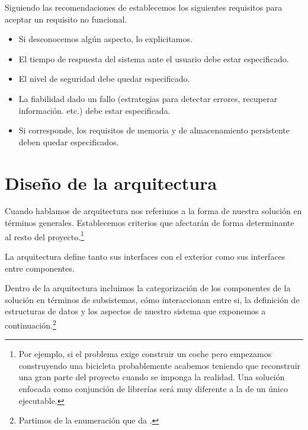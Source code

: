 Siguiendo las recomendaciones de \cite[Checklist: Requirements]{CodeComplete2} establecemos
los siguientes requisitos para aceptar un requisito no funcional. 

\begin{itemize}[noitemsep,nolistsep]
    \item Si desconocemos algún aspecto, lo explicitamos.
    \item El tiempo de respuesta del sistema ante el usuario debe estar especificado.
    \item El nivel de seguridad debe quedar especificado.
    \item La fiabilidad dado un fallo (estrategias para detectar errores, recuperar información. etc.) debe estar especificada.
    \item Si corresponde, los requisitos de memoria y de almacenamiento persistente deben quedar especificados.
\end{itemize}

\section{Diseño de la arquitectura}

Cuando hablamos de arquitectura nos referimos a la forma de nuestra solución en términos generales.
Establecemos criterios que afectarán de forma determinante al resto del proyecto.\footnote{
    Por ejemplo, si el problema exige construir un coche pero empezamos construyendo una bicicleta probablemente acabemos
    teniendo que reconstruir una gran parte del proyecto cuando se imponga la realidad.
    Una solución enfocada como conjunción de librerías será muy diferente a la de un único ejecutable.
}

La arquitectura define tanto sus interfaces con el exterior como sus interfaces entre componentes.

Dentro de la arquitectura incluimos la categorización de los componentes de la solución en términos
de subsistemas, cómo interaccionan entre si, la definición de estructuras de datos y los aspectos
de nuestro sistema que exponemos a continuación.\footnote{Partimos de la enumeración que da
\cite[Architecture Prerequisite]{CodeComplete2}.}

